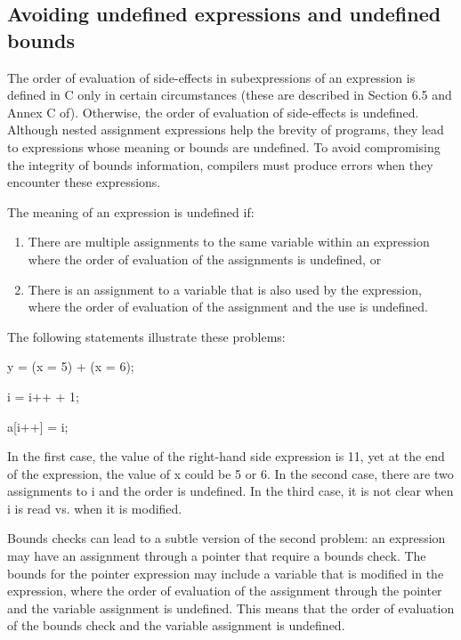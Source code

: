 \documentclass[]{article}
\begin{document}
\subsection{\texorpdfstring{\protect\hypertarget{ux5fToc426641091}{}{\protect\hypertarget{ux5fRef426706811}{}{\protect\hypertarget{ux5fRef435001874}{}{\protect\hypertarget{ux5fToc435434966}{}{\protect\hypertarget{ux5fToc437460794}{}{\protect\hypertarget{ux5fToc440445475}{}{\protect\hypertarget{ux5fToc440449257}{}{\protect\hypertarget{ux5fToc440551907}{}{}}}}}}}}Avoiding
undefined expressions and undefined
bounds}{Avoiding undefined expressions and undefined bounds}}\label{avoiding-undefined-expressions-and-undefined-bounds}

The order of evaluation of side-effects in subexpressions of an
expression is defined in C only in certain circumstances (these are
described in Section 6.5 and Annex C of). Otherwise, the order of
evaluation of side-effects is undefined. Although nested assignment
expressions help the brevity of programs, they lead to expressions whose
meaning or bounds are undefined. To avoid compromising the integrity of
bounds information, compilers must produce errors when they encounter
these expressions.

The meaning of an expression is undefined if:

\begin{enumerate}
\def\labelenumi{\arabic{enumi}.}
\item
  There are multiple assignments to the same variable within an
  expression where the order of evaluation of the assignments is
  undefined, or
\item
  There is an assignment to a variable that is also used by the
  expression, where the order of evaluation of the assignment and the
  use is undefined.
\end{enumerate}

The following statements illustrate these problems:

y = (x = 5) + (x = 6);

i = i++ + 1;

a{[}i++{]} = i;

In the first case, the value of the right-hand side expression is 11,
yet at the end of the expression, the value of x could be 5 or 6. In the
second case, there are two assignments to i and the order is undefined.
In the third case, it is not clear when i is read vs. when it is
modified.

Bounds checks can lead to a subtle version of the second problem: an
expression may have an assignment through a pointer that require a
bounds check. The bounds for the pointer expression may include a
variable that is modified in the expression, where the order of
evaluation of the assignment through the pointer and the variable
assignment is undefined. This means that the order of evaluation of the
bounds check and the variable assignment is undefined.
\end{document}
